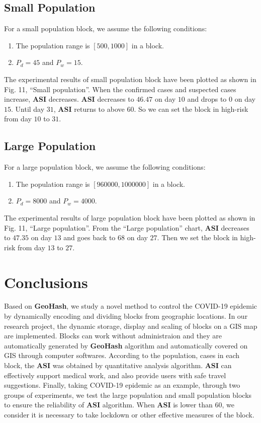 \documentclass[conference]{IEEEtran}
\begin{document}
\subsection{Small Population}
For a small population block, we assume the following conditions:
\begin{enumerate}
    \item The population range is $[500,1000]$ in a block.
    \item $P_d=45$ and $P_w=15$.
\end{enumerate}
The experimental results of small population block have been plotted as shown in Fig. 11, ``Small population''.
When the confirmed cases and suspected cases increase, \textbf{ASI} decreases.
\textbf{ASI} decreases to $46.47$ on day $10$ and drops to $0$ on day $15$.
Until day $31$, \textbf{ASI} returns to above $60$.
So we can set the block in high-risk from day $10$ to $31$.

\subsection{Large Population}
For a large population block, we assume the following conditions:
\begin{enumerate}
    \item The population range is $[960000,1000000]$ in a block.
    \item $P_d=8000$ and $P_w=4000$.
\end{enumerate}
The experimental results of large population block have been plotted as shown in Fig. 11, ``Large population''.
From the ``Large population'' chart, \textbf{ASI} decreases to $47.35$ on day $13$ and goes back to $68$ on day $27$.
Then we set the block in high-risk from day $13$ to $27$.

\section{Conclusions}
Based on \textbf{GeoHash}, we study a novel method to control the COVID-19 epidemic by dynamically encoding and dividing blocks from geographic locations.
In our research project, the dynamic storage, display and scaling of blocks on a GIS map are implemented.
Blocks can work without administraion and they are automatically generated by \textbf{GeoHash} algorithm and automatically covered on GIS through computer softwares.
According to the population, cases in each block, the \textbf{ASI} was obtained by quantitative analysis algorithm.
\textbf{ASI} can effectively support medical work, and also provide users with safe travel suggestions.
Finally, taking COVID-19 epidemic as an example, through two groups of experiments, we test the large population and small population blocks to ensure the reliability of \textbf{ASI} algorithm.
When \textbf{ASI} is lower than 60, we consider it is necessary to take lockdown or other effective measures of the block.
\end{document}
